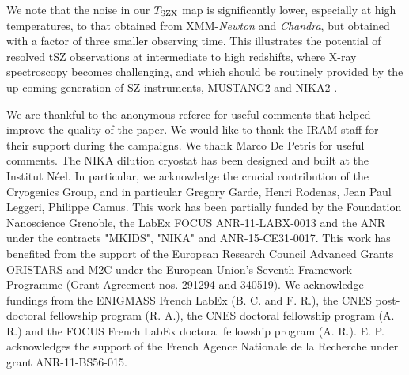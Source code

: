 \documentclass[twocolumn,traditabstract]{aa}
\def\TSZ {T_{\rm SZX}}
\begin{document}
We note that the noise in our $\TSZ$ map is significantly lower, especially at high temperatures, to that obtained from XMM-\textit{Newton} and \textit{Chandra}, but obtained with a factor of three smaller observing time. This illustrates the potential of resolved tSZ observations at intermediate to high redshifts, where X-ray spectroscopy becomes challenging, and which should be routinely provided by the up-coming generation of SZ instruments, MUSTANG2 \citep{Dicker2014} and NIKA2 \citep{Calvo2016,Comis2016}.

\begin{acknowledgements}
We are thankful to the anonymous referee for useful comments that helped improve the quality of the paper.
We would like to thank the IRAM staff for their support during the campaigns. 
We thank Marco De Petris for useful comments.
The NIKA dilution cryostat has been designed and built at the Institut N\'eel. In particular, we acknowledge the crucial contribution of the Cryogenics Group, and in particular Gregory Garde, Henri Rodenas, Jean Paul Leggeri, Philippe Camus. 
This work has been partially funded by the Foundation Nanoscience Grenoble, the LabEx FOCUS ANR-11-LABX-0013 and the ANR under the contracts "MKIDS", "NIKA" and ANR-15-CE31-0017. 
This work has benefited from the support of the European Research Council Advanced Grants ORISTARS and M2C under the European Union's Seventh Framework Programme (Grant Agreement nos. 291294 and 340519).
We acknowledge fundings from the ENIGMASS French LabEx (B. C. and F. R.), the CNES post-doctoral fellowship program (R. A.), the CNES doctoral fellowship program (A. R.) and the FOCUS French LabEx doctoral fellowship program (A. R.).
E. P. acknowledges the support of the French Agence Nationale de la Recherche under grant ANR-11-BS56-015.
\end{acknowledgements}



\appendix
\end{document}
